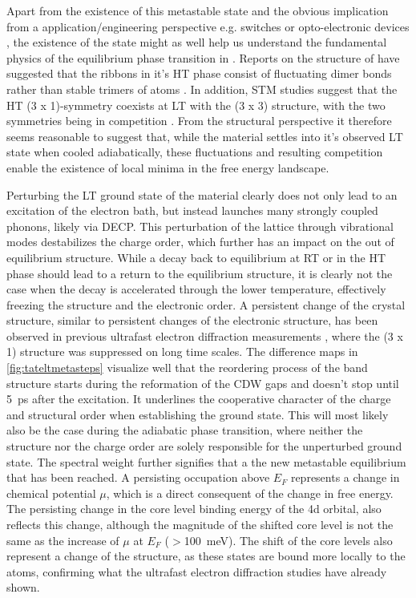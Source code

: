 Apart from the existence of this metastable state and the obvious implication from a application/engineering perspective e.g. switches or opto-electronic devices \cite{bao_light-induced_2022, schaibley_valleytronics_2016,tokura_emergent_2017,konstantatos_current_2018,liu_semimetals_2020,du_engineering_2021}, the existence of the state might as well help us understand the fundamental physics of the equilibrium phase transition in .
Reports on the structure of  have suggested that the ribbons in it's HT phase consist of fluctuating dimer bonds rather than stable trimers of  atoms \cite{katayama_observation_2023}.
In addition, STM studies suggest that the HT (3 x 1)-symmetry coexists at LT with the (3 x 3) structure, with the two symmetries being in competition \cite{feng_charge_2016}.
From the structural perspective it therefore seems reasonable to suggest that, while the material settles into it's observed LT state when cooled adiabatically, these fluctuations and resulting competition enable the existence of local minima in the free energy landscape.

Perturbing the LT ground state of the material clearly does not only lead to an excitation of the electron bath, but instead launches many strongly coupled phonons, likely via DECP.
This perturbation of the lattice through vibrational modes destabilizes the charge order, which further has an impact on the out of equilibrium structure.
While a decay back to equilibrium at RT or in the HT phase should lead to a return to the equilibrium structure, it is clearly not the case when the decay is accelerated through the lower temperature, effectively freezing the structure and the electronic order.
A persistent change of the crystal structure, similar to persistent changes of the electronic structure, has been observed in previous ultrafast electron diffraction measurements \cite{siddiqui_ultrafast_2021, domrose_femtosecond_2024}, where the (3 x 1) structure was suppressed on long time scales.
The difference maps in \ref{fig:tateltmetasteps} visualize well that the reordering process of the band structure starts during the reformation of the CDW gaps and doesn't stop until \qty{5}{\pico\second} after the excitation.
It underlines the cooperative character of the charge and structural order when establishing the ground state.
This will most likely also be the case during the adiabatic phase transition, where neither the structure nor the charge order are solely responsible for the unperturbed ground state.
The spectral weight further signifies that a the new metastable equilibrium that has been reached.
A persisting occupation above $E_F$ represents a change in chemical potential $\mu$, which is a direct consequent of the change in free energy.
The persisting change in the core level binding energy of the  4d orbital, also reflects this change, although the magnitude of the shifted core level is not the same as the increase of $\mu$ at $E_F$ ($>$\qty{100}{\milli\electronvolt}).
The shift of the core levels also represent a change of the structure, as these states are bound more locally to the  atoms, confirming what the ultrafast electron diffraction studies have already shown.

